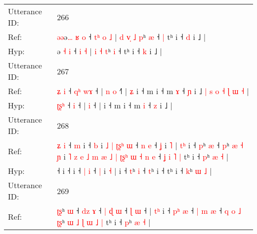 \documentclass[10pt]{article}
\DeclareRobustCommand{\hl}[1]{{\textcolor{red}{#1}}}
\begin{document}
\begin{longtable}{ll}
 \\
\midrule
Utterance ID: & 266 \\
Ref: & \hl{ə}\hl{ə}ə\hl{…} \hl{ʁ} \hl{o} ˧\hl{ }\hl{t}\hl{ʰ} \hl{o} \hl{˩} |\hl{ }\hl{d} \hl{v}\hl{̩} \hl{˩} \hl{p}ʰ \hl{æ} ˧\hl{ }\hl{|} tʰ i ˧ \hl{d} i ˩ |
 \\
Hyp: & \hl{}\hl{}ə\hl{} \hl{˧} \hl{i} ˧\hl{}\hl{}\hl{} \hl{i} \hl{˧} |\hl{}\hl{} \hl{}\hl{i} \hl{˧} \hl{t}ʰ \hl{i} ˧\hl{}\hl{} tʰ i ˧ \hl{k} i ˩ |
 \\
\midrule
Utterance ID: & 267 \\
Ref: & \hl{ʑ}\hl{ }\hl{i} ˧\hl{ }\hl{q}\hl{ʰ} \hl{w}\hl{ɤ} ˧ |\hl{ }\hl{n} \hl{o} ˧\hl{˥} |\hl{ }\hl{ʑ} i ˧ m i ˧ m \hl{ɤ} ˧ \hl{ɲ} i ˩\hl{ }\hl{|}\hl{ }\hl{s}\hl{ }\hl{o}\hl{ }\hl{˧}\hl{ }\hl{ɭ}\hl{ }\hl{ɯ}\hl{ }\hl{˧} |
 \\
Hyp: & \hl{ʈ}\hl{ʂ}\hl{ʰ} ˧\hl{}\hl{}\hl{} \hl{}\hl{i} ˧ |\hl{}\hl{} \hl{i} ˧\hl{} |\hl{}\hl{} i ˧ m i ˧ m \hl{i} ˧ \hl{z} i ˩\hl{}\hl{}\hl{}\hl{}\hl{}\hl{}\hl{}\hl{}\hl{}\hl{}\hl{}\hl{}\hl{}\hl{} |
 \\
\midrule
Utterance ID: & 268 \\
Ref: & \hl{ʑ}\hl{ }\hl{i}\hl{ }˧\hl{ }\hl{m} i ˧\hl{ }\hl{b} i\hl{ }\hl{˩}\hl{ }\hl{|}\hl{ }\hl{ʈ}\hl{ʂ}\hl{ʰ}\hl{ }\hl{ɯ} ˧ \hl{n} \hl{e} ˧ \hl{ʝ} i \hl{˥} |\hl{ }\hl{t}\hl{ʰ} i ˧ \hl{p}ʰ \hl{æ} ˧ \hl{p}ʰ\hl{ }\hl{æ}\hl{ }\hl{˧}\hl{ }\hl{ɲ} i\hl{ }\hl{˥}\hl{ }\hl{z}\hl{ }\hl{e}\hl{ }\hl{˩}\hl{ }\hl{m}\hl{ }\hl{æ}\hl{ }\hl{˩}\hl{ }\hl{|}\hl{ }\hl{ʈ}\hl{ʂ}\hl{ʰ}\hl{ }\hl{ɯ}\hl{ }\hl{˧}\hl{ }\hl{n}\hl{ }\hl{e} ˧\hl{ }\hl{ʝ}\hl{ }\hl{i}\hl{ }\hl{˥}\hl{ }\hl{|} tʰ i ˧ \hl{p}ʰ \hl{æ} \hl{˧} |
 \\
Hyp: & \hl{}\hl{}\hl{}\hl{}˧\hl{}\hl{} i ˧\hl{}\hl{} i\hl{}\hl{}\hl{}\hl{}\hl{}\hl{}\hl{}\hl{}\hl{}\hl{} ˧ \hl{|} \hl{i} ˧ \hl{|} i \hl{˧} |\hl{}\hl{}\hl{} i ˧ \hl{t}ʰ \hl{i} ˧ \hl{t}ʰ\hl{}\hl{}\hl{}\hl{}\hl{}\hl{} i\hl{}\hl{}\hl{}\hl{}\hl{}\hl{}\hl{}\hl{}\hl{}\hl{}\hl{}\hl{}\hl{}\hl{}\hl{}\hl{}\hl{}\hl{}\hl{}\hl{}\hl{}\hl{}\hl{}\hl{}\hl{}\hl{}\hl{}\hl{} ˧\hl{}\hl{}\hl{}\hl{}\hl{}\hl{}\hl{}\hl{} tʰ i ˧ \hl{k}ʰ \hl{ɯ} \hl{˩} |
 \\
\midrule
Utterance ID: & 269 \\
Ref: & \hl{ʈ}\hl{ʂ}ʰ \hl{ɯ} ˧\hl{ }\hl{d}\hl{z} \hl{ɤ} ˧\hl{ }\hl{|}\hl{ }\hl{ɖ} \hl{ɯ} ˧ \hl{ɭ} \hl{ɯ} ˧ |\hl{ }\hl{t}\hl{ʰ} i ˧ \hl{p}\hl{ʰ} \hl{æ} ˧ \hl{|}\hl{ }\hl{m} \hl{æ} ˧\hl{ }\hl{q}\hl{ }\hl{o}\hl{ }\hl{˩} \hl{ʈ}\hl{ʂ}ʰ\hl{ }\hl{ɯ}\hl{ }\hl{˩}\hl{ }\hl{ɭ}\hl{ }\hl{ɯ} \hl{˩} \hl{|} tʰ i ˧ \hl{p}ʰ \hl{æ} \hl{˧} |
 \\

\end{longtable}
\end{document}
